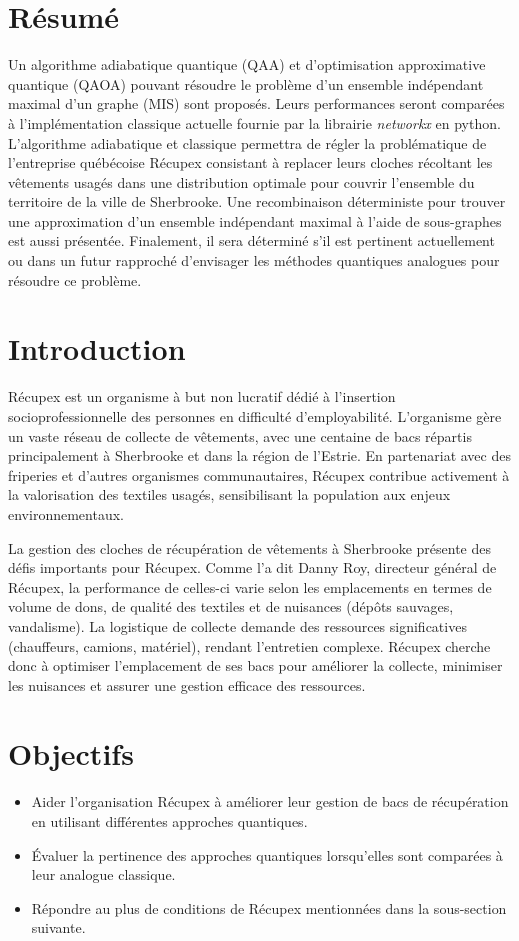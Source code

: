 \documentclass[11pt]{article}
\begin{document}

\setcounter{figure}{0}
\tableofcontents
\newpage
\section*{Résumé}
Un algorithme adiabatique quantique (QAA) et d'optimisation approximative quantique (QAOA) pouvant résoudre le problème d'un ensemble indépendant maximal d'un graphe (MIS) sont proposés. Leurs performances seront comparées à l'implémentation classique actuelle fournie par la librairie \textit{networkx} en python. L'algorithme adiabatique et classique permettra de régler la problématique de l'entreprise québécoise Récupex consistant à replacer leurs cloches récoltant les vêtements usagés dans une distribution optimale pour couvrir l'ensemble du territoire de la ville de Sherbrooke. Une recombinaison déterministe pour trouver une approximation d'un ensemble indépendant maximal à l'aide de sous-graphes est aussi présentée. Finalement, il sera déterminé s'il est pertinent actuellement ou dans un futur rapproché d'envisager les méthodes quantiques analogues pour résoudre ce problème.

\section{Introduction}
Récupex \cite{noauthor_recupex_nodate}est un organisme à but non lucratif dédié à l’insertion socioprofessionnelle des personnes en difficulté d’employabilité. L’organisme gère un vaste réseau de collecte de vêtements, avec une centaine de bacs répartis principalement à Sherbrooke et dans la région de l’Estrie. En partenariat avec des friperies et d’autres organismes communautaires, Récupex contribue activement à la valorisation des textiles usagés, sensibilisant la population aux enjeux environnementaux.

La gestion des cloches de récupération de vêtements à Sherbrooke présente des défis importants pour Récupex. Comme l'a dit Danny Roy, directeur général de Récupex, la performance de celles-ci varie selon les emplacements en termes de volume de dons, de qualité des textiles et de nuisances (dépôts sauvages, vandalisme). La logistique de collecte demande des ressources significatives (chauffeurs, camions, matériel), rendant l'entretien complexe. Récupex cherche donc à optimiser l'emplacement de ses bacs pour améliorer la collecte, minimiser les nuisances et assurer une gestion efficace des ressources.

\section{Objectifs}
\begin{itemize}
    \item Aider l'organisation Récupex à améliorer leur gestion de bacs de récupération en utilisant différentes approches quantiques.
\item Évaluer la pertinence des approches quantiques lorsqu’elles sont comparées à leur analogue classique.
\item Répondre au plus de conditions de Récupex mentionnées dans la sous-section suivante.
\end{itemize}
\end{document}
